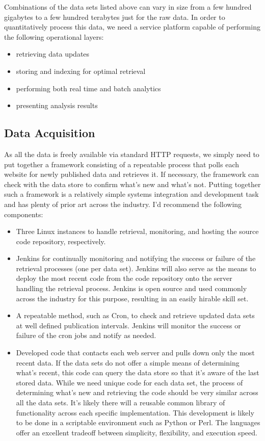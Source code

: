 Combinations of the data sets listed above can vary in size from a few hundred gigabytes to a few hundred terabytes just for the raw data. In order to quantitatively process this data, we need a service platform capable of performing the following operational layers:
\begin{itemize}
	\item retrieving data updates
	\item storing and indexing for optimal retrieval
	\item performing both real time and batch analytics
	\item presenting analysis results
\end{itemize}
\subsection*{Data Acquisition}
As all the data is freely available via standard HTTP requests, we simply need to put together a framework consisting of a repeatable process that polls each website for newly published data and retrieves it. If necessary, the framework can check with the data store to confirm what's new and what's not. Putting together such a framework is a relatively simple systems integration and development task and has plenty of prior art across the industry. I'd recommend the following components:
\begin{itemize}
	\item Three Linux instances to handle retrieval, monitoring, and hosting the source code repository, respectively.
	\item Jenkins for continually monitoring and notifying the success or failure of the retrieval processes (one per data set). Jenkins will also serve as the means to deploy the most recent code from the code repository onto the server handling the retrieval process. Jenkins is open source and used commonly across the industry for this purpose, resulting in an easily hirable skill set.\cite{jenkins}
	\item A repeatable method, such as Cron, to check and retrieve updated data sets at well defined publication intervals. Jenkins will monitor the success or failure of the cron jobs and notify as needed.
	\item Developed code that contacts each web server and pulls down only the most recent data. If the data sets do not offer a simple means of determining what's recent, this code can query the data store so that it's aware of the last stored data. While we need unique code for each data set, the process of determining what's new and retrieving the code should be very similar across all the data sets. It's likely there will a reusable common library of functionality across each specific implementation. This development is likely to be done in a scriptable environment such as Python or Perl. The languages offer an excellent tradeoff between simplicity, flexibility, and execution speed.
\end{itemize}

